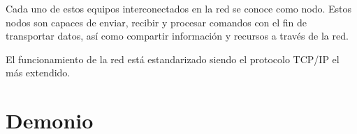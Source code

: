 
Cada uno de estos equipos interconectados en la red se conoce como nodo. Estos nodos son capaces de enviar, recibir y procesar comandos con el fin de transportar datos, así como compartir informaci\'on y recursos a través de la red.

El funcionamiento de la red está estandarizado siendo el protocolo TCP/IP el más extendido.

%


\section{Demonio}


